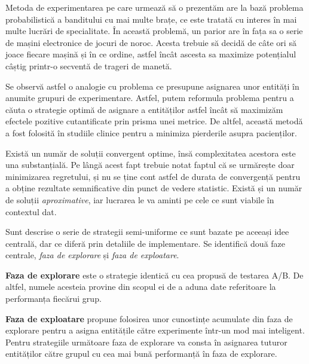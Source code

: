 Metoda de experimentarea pe care urmează să o prezentăm are la bază problema probabilistică a banditului cu mai multe brațe, ce este tratată cu interes în mai multe lucrări de specialitate. În această problemă, un parior are în fața sa o serie de mașini electronice de jocuri de noroc. Acesta trebuie să decidă de câte ori să joace fiecare mașină și în ce ordine, astfel încât ascesta sa maximize potențialul câștig printr-o secventă de trageri de manetă.

Se observă astfel o analogie cu problema ce presupune asignarea unor entități în anumite grupuri de experimentare. Astfel, putem reformula problema pentru a căuta o strategie optimă de asignare a entităților astfel încât să maximizăm efectele pozitive cutantificate prin prisma unei metrice. De altfel, această metodă a fost folosită în studiile clinice pentru a minimiza pierderile asupra pacienților.

Există un număr de soluții convergent optime, însă complexitatea acestora este una substanțială. Pe lângă acest fapt trebuie notat faptul că se urmărește doar minimizarea regretului, și nu se ține cont astfel de durata de convergență pentru a obține rezultate semnificative din punct de vedere statistic. Există și un număr de soluții \textit{aproximative}, iar lucrarea le va aminti pe cele ce sunt viabile în contextul dat.

Sunt descrise o serie de strategii semi-uniforme ce sunt bazate pe aceeași idee centrală, dar ce diferă prin detaliile de implementare. Se identifică două faze centrale, \textit{faza de explorare} și \textit{faza de exploatare}.

\textbf{Faza de explorare} este o strategie identică cu cea propusă de testarea A/B. De altfel, numele acesteia provine din scopul ei de a aduna date referitoare la performanța fiecărui grup.

\textbf{Faza de exploatare} propune folosirea unor cunostințe acumulate din faza de explorare pentru a asigna entitățile către experimente într-un mod mai inteligent. Pentru strategiile următoare faza de explorare va consta în asignarea tuturor entităților către grupul cu cea mai bună performanță în faza de explorare.

